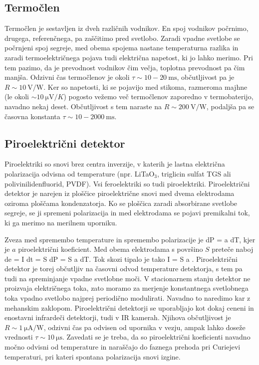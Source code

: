 \subsection*{Termočlen}
Termočlen je sestavljen iz dveh različnih vodnikov. En spoj vodnikov počrnimo, drugega, 
referenčnega, pa zaščitimo pred svetlobo. Zaradi vpadne svetlobe se počrnjeni spoj 
segreje, med obema spojema nastane temperaturna razlika in zaradi termoelektričnega 
pojava tudi električna napetost, ki jo lahko merimo. Pri tem pazimo, da je prevodnost
vodnikov čim večja, toplotna prevodnost pa čim manjša. Odzivni čas termočlenov je 
okoli $\tau \sim 10-20~\si{\milli\second}$, občutljivost pa je $R \sim 10~\si{\volt/\watt}$.
Ker so napetosti, ki se pojavijo med stikoma, razmeroma majhne (le okoli 
$\sim 10~\si{\micro\volt/K}$) pogosto vežemo več termočlenov zaporedno v termobaterijo, navadno
nekaj deset. Občutljivost s tem naraste na $R \sim 200~\si{\volt/\watt}$, podaljša 
pa se časovna konstanta $\tau \sim 10-2000~\si{\milli\second}$.

\subsection*{Piroelektrični detektor}
Piroelektriki so snovi brez centra inverzije, v katerih je lastna električna 
polarizacija odvisna od temperature (npr. LiTaO$_3$, triglicin sulfat TGS ali
polivinilidenfluorid, PVDF). 
Vsi feroelektriki so tudi piroelektriki. Piroelektrični detektor je narejen iz 
ploščice piroelektrične snovi med dvema elektrodama oziroma ploščama kondenzatorja.
Ko se ploščica zaradi absorbirane svetlobe segreje, se ji spremeni polarizacija in 
med elektrodama se pojavi premikalni tok, ki ga merimo na merilnem uporniku.

Zveza med spremembo temperature in spremembo polarizacije je
\beq
dP = a dT,
\eeq
kjer je $a$ piroelektrični koeficient. Med obema elektrodama s površino $S$ preteče naboj
\beq
de = I dt = S dP = S a dT.
\eeq
Tok skozi tipalo je tako
\beq
I = S a .
\label{piro}
\eeq
Piroelektrični detektor je torej občutljiv na časovni odvod temperature detektorja, 
s tem pa tudi na spreminjanje vpadne svetlobne moči. V stacionarnem stanju 
detektor ne proizvaja električnega toka, zato moramo za merjenje 
konstantnega svetlobnega toka vpadno svetlobo najprej periodično modulirati.
Navadno to naredimo kar z mehanskim zaklopom. Piroelektrični detektorji
se uporabljajo kot dokaj ceneni in enostavni infrardeči detektorji, tudi v IR kamerah. 
Njihova občutljivost je $R \sim 1~\si{\micro\ampere/\watt}$, odzivni čas pa odvisen od 
upornika v vezju, ampak lahko doseže vrednosti $\tau \sim 10~\si{\micro\second}$.
Zavedati se je treba, da so piroelektrični koeficienti navadno močno 
odvisni od temperature in naraščajo do faznega prehoda pri Curiejevi temperaturi, 
pri kateri spontana polarizacija snovi izgine. 

